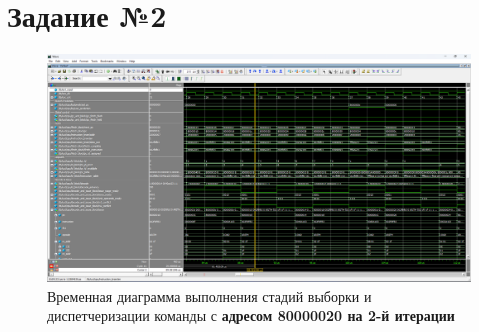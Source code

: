 \chapter{Задание №2}

\begin{figure}
    \centering
    \includegraphics[width=1\linewidth]{images/task_02.png}
    \caption{Временная диаграмма выполнения стадий выборки и диспетчеризации команды с \textbf{адресом 80000020 на 2-й итерации}}
    \label{fig:task_02}
\end{figure}